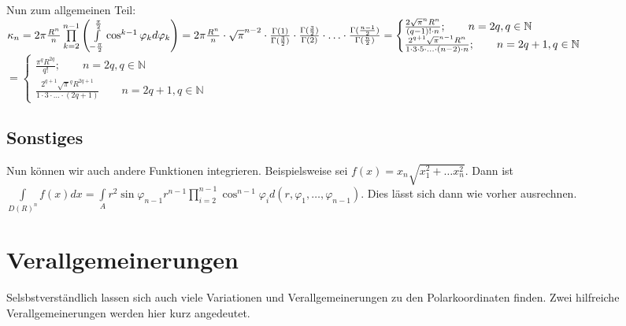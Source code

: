 \documentclass[a4paper,11pt]{scrartcl}
\newcommand{\N}{{\ensuremath{\mathbb{N}}}}
\begin{document}
Nun zum allgemeinen Teil:\\
$\kappa_n=2\pi\frac{R^n}{n}\prod\limits_{k=2}^{n-1}\left(\int\limits_{-\frac{\pi}{2}}^\frac{\pi}{2}\cos^{k-1}\varphi_k d\varphi_k\right)=2\pi\frac{R^n}{n}\cdot\sqrt{\pi}^{n-2}\cdot\frac{\Gamma(1)}{\Gamma(\frac{3}{2})}\cdot\frac{\Gamma(\frac{3}{2})}{\Gamma(2)}\cdot\ldots\cdot\frac{\Gamma(\frac{n-1}{2})}{\Gamma(\frac{n}{2})}
\\=\begin{cases}\frac{2\sqrt{\pi}^n R^n}{(q-1)!\cdot n}; \qquad n=2q, q\in\N \\ \frac{2^{q+1}\sqrt{\pi}^{n-1}R^n}{1\cdot 3\cdot 5\cdot \ldots\cdot(n-2)\cdot n}; \qquad n=2q+1, q\in\N\end{cases}$\\
$=\begin{cases}\frac{\pi^q R^{2q}}{q!}; \qquad n=2q, q\in\N \\ \frac{2^{q+1}\sqrt{\pi}^q R^{2q+1}}{1\cdot 3\cdot \ldots\cdot (2q+1)} \qquad n=2q+1, q\in\N\end{cases} $
\subsection{Sonstiges}
Nun können wir auch andere Funktionen integrieren. Beispielsweise sei $f(x)=x_n\sqrt{x_1^2+\ldots x_n^2}$. Dann ist $\int\limits_{D(R)^n}f(x)dx=\int\limits_A r^2\sin\varphi_{n-1}r^{n-1}\prod\limits_{i=2}^{n-1}\cos^{n-1}\varphi_i d(r,\varphi_1,\ldots,\varphi_{n-1})$. Dies lässt sich dann wie vorher ausrechnen.
\section{Verallgemeinerungen}
Selsbstverständlich lassen sich auch viele Variationen und Verallgemeinerungen zu den Polarkoordinaten finden. Zwei hilfreiche Verallgemeinerungen werden hier kurz angedeutet.
\end{document}
